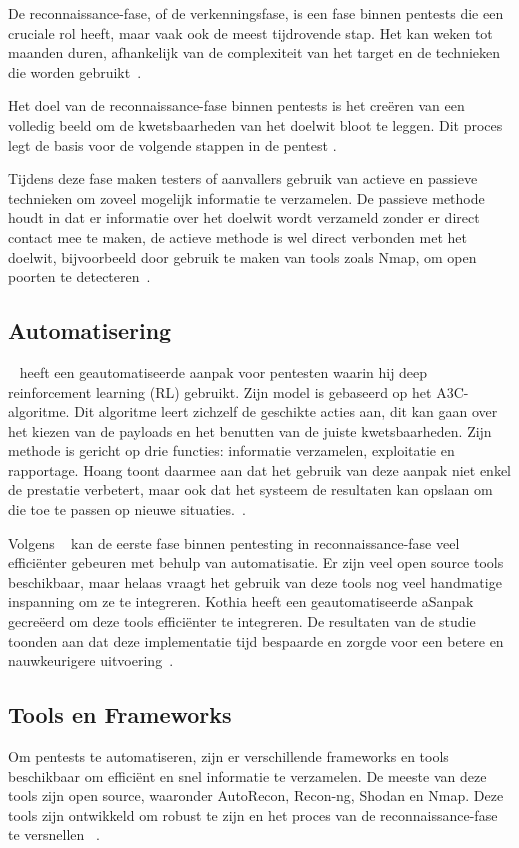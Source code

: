 De reconnaissance-fase, of de verkenningsfase, is een fase binnen pentests die een cruciale rol heeft, maar vaak ook de meest tijdrovende stap.
Het kan weken tot maanden duren, afhankelijk van de complexiteit van het target en de technieken die worden gebruikt~\autocite{Shah}. 

Het doel van de reconnaissance-fase binnen pentests is het creëren van een volledig beeld om de 
kwetsbaarheden van het doelwit bloot te leggen. Dit proces legt de basis voor de
volgende stappen in de pentest \autocite{Kothia}.

Tijdens deze fase maken testers of aanvallers gebruik van actieve en passieve technieken om zoveel
mogelijk informatie te verzamelen. De passieve methode houdt in dat er informatie over het doelwit wordt verzameld zonder er direct contact mee te maken, 
de actieve methode is wel direct verbonden met het doelwit, bijvoorbeeld door gebruik te maken van tools zoals Nmap, om open poorten te detecteren~\autocite{Shah}.


\subsection{Automatisering}

~\textcite{Hoang} heeft een geautomatiseerde aanpak voor pentesten waarin hij deep reinforcement 
learning (RL) gebruikt. Zijn model is gebaseerd op het A3C-algoritme. Dit algoritme leert zichzelf de geschikte acties aan, dit kan 
gaan over het kiezen van de payloads en het benutten van de juiste kwetsbaarheden. Zijn methode is gericht op drie functies: informatie verzamelen, 
exploitatie en rapportage. Hoang toont daarmee aan dat het gebruik van deze aanpak niet enkel de prestatie verbetert, maar ook dat het systeem de resultaten 
kan opslaan om die toe te passen op nieuwe situaties.~\autocite{Hoang}.


Volgens ~\textcite{Kothia} kan de eerste fase binnen pentesting in reconnaissance-fase veel 
efficiënter gebeuren met behulp van automatisatie. Er zijn veel open source tools beschikbaar, maar helaas vraagt het gebruik van deze 
tools nog veel handmatige inspanning om ze te integreren. Kothia heeft een geautomatiseerde aSanpak gecreëerd om deze tools
efficiënter te integreren. De resultaten van de studie toonden aan dat deze implementatie tijd 
bespaarde en zorgde voor een betere en nauwkeurigere uitvoering~\autocite{Kothia}.


\subsection{Tools en Frameworks}
 Om pentests te automatiseren, zijn er verschillende frameworks en tools beschikbaar om 
efficiënt en snel informatie te verzamelen. De meeste van deze tools zijn open source, waaronder 
AutoRecon, Recon-ng, Shodan en Nmap. Deze tools zijn ontwikkeld om robust te zijn en het proces van de reconnaissance-fase te versnellen ~\autocite{Shebli}.


